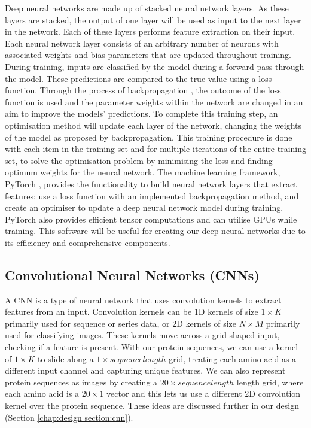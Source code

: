 \documentclass{l4proj}
\begin{document}
Deep neural networks are made up of stacked neural network layers. As these layers are stacked, the output of one layer will be used as input to the next layer in the network. Each of these layers performs feature extraction on their input. Each neural network layer consists of an arbitrary number of neurons with associated weights and bias parameters that are updated throughout training. During training, inputs are classified by the model during a forward pass through the model. These predictions are compared to the true value using a loss function. Through the process of backpropagation \citep{Goodfellow-et-al-2016}, the outcome of the loss function is used and the parameter weights within the network are changed in an aim to improve the models' predictions. To complete this training step, an optimisation method will update each layer of the network, changing the weights of the model as proposed by backpropagation. This training procedure is done with each item in the training set and for multiple iterations of the entire training set, to solve the optimisation problem by minimising the loss and finding optimum weights for the neural network. The machine learning framework, PyTorch \citep{pytorch}, provides the functionality to build neural network layers that extract features; use a loss function with an implemented backpropagation method, and create an optimiser to update a deep neural network model during training. PyTorch also provides efficient tensor computations and can utilise GPUs while training. This software will be useful for creating our deep neural networks due to its efficiency and comprehensive components.

\subsection{Convolutional Neural Networks (CNNs)}
\label{chap:background sec:CNN}

A CNN is a type of neural network that uses convolution kernels to extract features from an input. Convolution kernels can be 1D kernels of size $1\times K$ primarily used for sequence or series data, or 2D kernels of size $N\times M$ primarily used for classifying images. These kernels move across a grid shaped input, checking if a feature is present. With our protein sequences, we can use a kernel of $1\times K$ to slide along a $1\times sequence length$ grid, treating each amino acid as a different input channel and capturing unique features. We can also represent protein sequences as images by creating a $20\times sequence length$ length grid, where each amino acid is a $20\times 1$ vector and this lets us use a different 2D convolution kernel over the protein sequence. These ideas are discussed further in our design (Section \ref{chap:design section:cnn}).
\end{document}

